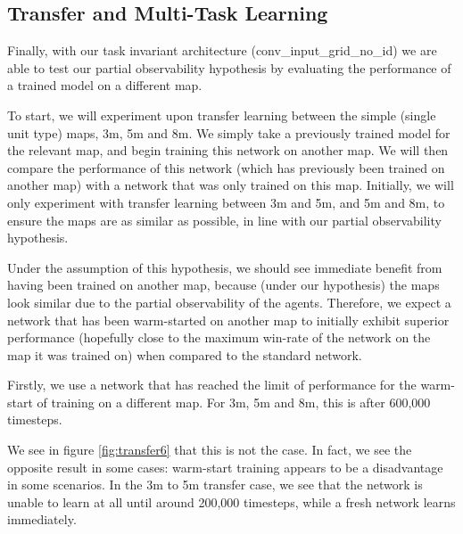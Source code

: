\subsection{Transfer and Multi-Task Learning}

Finally, with our task invariant architecture (conv\_input\_grid\_no\_id) we are able to test our partial observability hypothesis by evaluating the performance of a trained model on a different map.

To start, we will experiment upon transfer learning between the simple (single unit type) maps, 3m, 5m and 8m. We simply take a previously trained model for the relevant map, and begin training this network on another map. We will then compare the performance of this network (which has previously been trained on another map) with a network that was only trained on this map. Initially, we will only experiment with transfer learning between 3m and 5m, and 5m and 8m, to ensure the maps are as similar as possible, in line with our partial observability hypothesis.

Under the assumption of this hypothesis, we should see immediate benefit from having been trained on another map, because (under our hypothesis) the maps look similar due to the partial observability of the agents. Therefore, we expect a network that has been warm-started on another map to initially exhibit superior performance (hopefully close to the maximum win-rate of the network on the map it was trained on) when compared to the standard network.


Firstly, we use a network that has reached the limit of performance for the warm-start of training on a different map. For 3m, 5m and 8m, this is after 600,000 timesteps.


We see in figure \ref{fig:transfer6} that this is not the case. In fact, we see the opposite result in some cases: warm-start training appears to be a disadvantage in some scenarios. In the 3m to 5m transfer case, we see that the network is unable to learn at all until around 200,000 timesteps, while a fresh network learns immediately.


